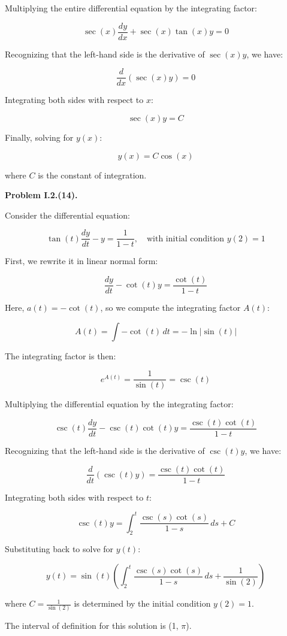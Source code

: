 \documentclass{article}
\begin{document}
Multiplying the entire differential equation by the integrating factor:

\[
\sec(x) \frac{dy}{dx} + \sec(x) \tan(x) y = 0
\]

Recognizing that the left-hand side is the derivative of \(\sec(x) y\), we have:

\[
\frac{d}{dx} \left(\sec(x) y \right) = 0
\]

Integrating both sides with respect to \(x\):

\[
\sec(x) y = C
\]

Finally, solving for \(y(x)\):

\[
y(x) = C \cos(x)
\]

where \(C\) is the constant of integration.



\textbf{Problem I.2.(14).}

Consider the differential equation:

\[
\tan(t) \frac{dy}{dt} - y = \frac{1}{1-t}, \quad \text{with initial condition } y(2) = 1
\]

First, we rewrite it in linear normal form:

\[
\frac{dy}{dt} - \cot(t) y = \frac{\cot(t)}{1-t}
\]

Here, \(a(t) = -\cot(t)\), so we compute the integrating factor \(A(t)\):

\[
A(t) = \int -\cot(t) \, dt = -\ln|\sin(t)|
\]

The integrating factor is then:

\[
e^{A(t)} = \frac{1}{\sin(t)} = \csc(t)
\]

Multiplying the differential equation by the integrating factor:

\[
\csc(t) \frac{dy}{dt} - \csc(t) \cot(t) y = \frac{\csc(t) \cot(t)}{1-t}
\]

Recognizing that the left-hand side is the derivative of \(\csc(t) y\), we have:

\[
\frac{d}{dt} \left(\csc(t) y \right) = \frac{\csc(t) \cot(t)}{1-t}
\]

Integrating both sides with respect to \(t\):

\[
\csc(t) y = \int_{2}^{t} \frac{\csc(s) \cot(s)}{1-s} \, ds + C
\]

Substituting back to solve for \(y(t)\):

\[
y(t) = \sin(t) \left( \int_{2}^{t} \frac{\csc(s) \cot(s)}{1-s} \, ds + \frac{1}{\sin(2)} \right)
\]

where \(C = \frac{1}{\sin(2)}\) is determined by the initial condition \(y(2) = 1\).

The interval of definition for this solution is (1, $\pi$).
\end{document}
